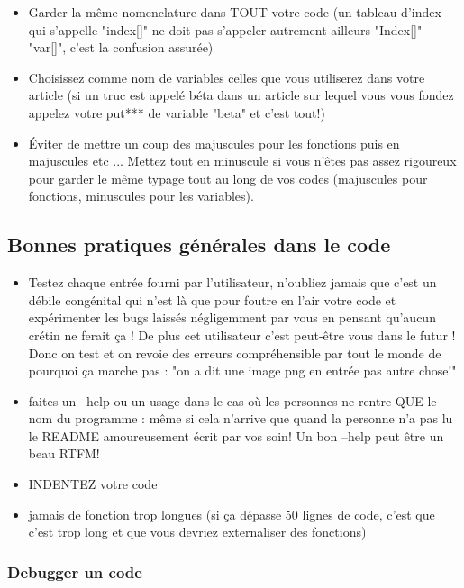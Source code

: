 \begin{itemize}
\item Garder la même nomenclature dans TOUT votre code (un tableau d'index qui s'appelle "index[]" 
ne doit pas s'appeler autrement ailleurs "Index[]" "var[]", c'est la confusion assurée)
\item Choisissez comme nom de variables celles que vous utiliserez dans votre article 
(si un truc est appelé béta dans un article sur lequel vous vous fondez appelez votre put*** 
de variable "beta" et c'est tout!)
\item Éviter de mettre un coup des majuscules pour les fonctions puis en majuscules etc ... 
Mettez tout en minuscule si vous n'êtes pas assez rigoureux pour garder le même typage tout 
au long de vos codes (majuscules pour fonctions, minuscules pour les variables).
\end{itemize}

\subsection{Bonnes pratiques générales dans le code}

\begin{itemize}
\item Testez chaque entrée fourni par l'utilisateur, n'oubliez jamais que c'est un débile congénital
 qui n'est là que pour foutre en l'air votre code et expérimenter les bugs laissés négligemment par 
vous en pensant qu'aucun crétin ne ferait ça ! De plus cet utilisateur c'est peut-être vous dans 
le futur ! Donc on test et on revoie des erreurs compréhensible par tout le monde de pourquoi ça 
marche pas : "on a dit une image png en entrée pas autre chose!"
\item faites un --help ou un usage dans le cas où les personnes ne rentre QUE le nom du programme : m\^eme
si cela n'arrive que quand la personne n'a pas lu le README amoureusement écrit par vos soin! Un bon
 --help peut être un beau RTFM!
\item INDENTEZ votre code
\item jamais de fonction trop longues (si ça dépasse 50 lignes de code, c'est que c'est trop
 long et que vous devriez externaliser des fonctions)
\end{itemize}

\subsubsection*{Debugger un code}

